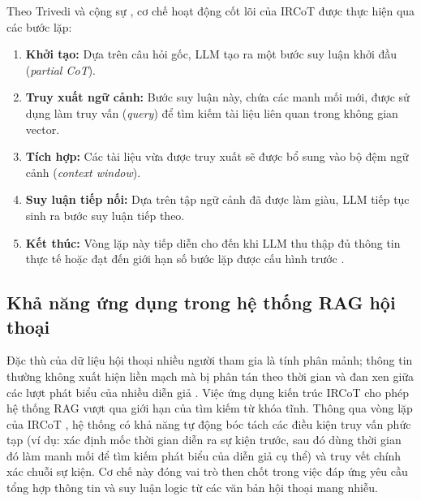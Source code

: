 Theo Trivedi và cộng sự \cite{trivedi2023interleaving}, cơ chế hoạt động cốt lõi của IRCoT được thực hiện qua các bước lặp:
\begin{enumerate}
    \item \textbf{Khởi tạo:} Dựa trên câu hỏi gốc, LLM tạo ra một bước suy luận khởi đầu (\textit{partial CoT}).
    \item \textbf{Truy xuất ngữ cảnh:} Bước suy luận này, chứa các manh mối mới, được sử dụng làm truy vấn (\textit{query}) để tìm kiếm tài liệu liên quan trong không gian vector.
    \item \textbf{Tích hợp:} Các tài liệu vừa được truy xuất sẽ được bổ sung vào bộ đệm ngữ cảnh (\textit{context window}).
    \item \textbf{Suy luận tiếp nối:} Dựa trên tập ngữ cảnh đã được làm giàu, LLM tiếp tục sinh ra bước suy luận tiếp theo.
    \item \textbf{Kết thúc:} Vòng lặp này tiếp diễn cho đến khi LLM thu thập đủ thông tin thực tế hoặc đạt đến giới hạn số bước lặp được cấu hình trước \cite{trivedi2023interleaving}.
\end{enumerate}

\subsection{Khả năng ứng dụng trong hệ thống RAG hội thoại}
Đặc thù của dữ liệu hội thoại nhiều người tham gia là tính phân mảnh; thông tin thường không xuất hiện liền mạch mà bị phân tán theo thời gian và đan xen giữa các lượt phát biểu của nhiều diễn giả \cite{zhong2021qmsum}. Việc ứng dụng kiến trúc IRCoT cho phép hệ thống RAG vượt qua giới hạn của tìm kiếm từ khóa tĩnh. Thông qua vòng lặp của IRCoT \cite{trivedi2023interleaving}, hệ thống có khả năng tự động bóc tách các điều kiện truy vấn phức tạp (ví dụ: xác định mốc thời gian diễn ra sự kiện trước, sau đó dùng thời gian đó làm manh mối để tìm kiếm phát biểu của diễn giả cụ thể) và truy vết chính xác chuỗi sự kiện. Cơ chế này đóng vai trò then chốt trong việc đáp ứng yêu cầu tổng hợp thông tin và suy luận logic từ các văn bản hội thoại mang nhiễu.